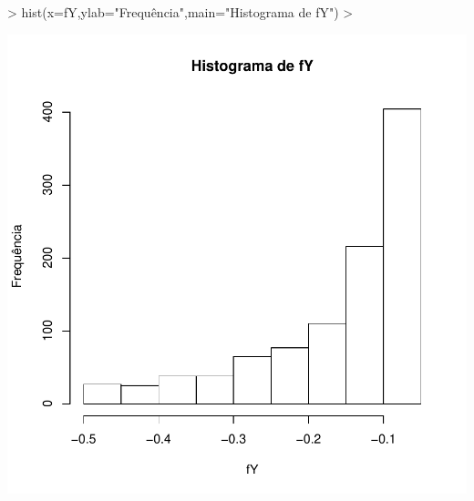\documentclass{article}
\begin{document}
\begin{Schunk}
\begin{Sinput}
> hist(x=fY,ylab="Frequência",main="Histograma de fY")
> 
\end{Sinput}
\end{Schunk}
\includegraphics{transformacao-010}
\end{document}
